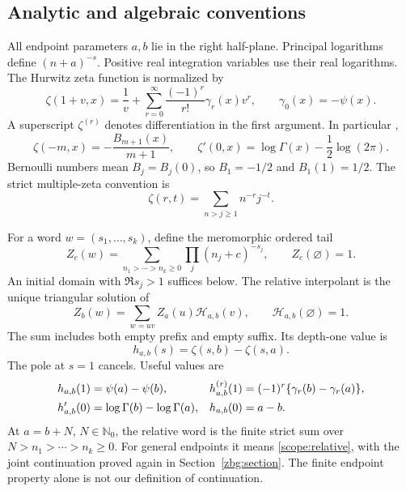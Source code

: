 \documentclass[11pt,letterpaper]{article}
\numberwithin{equation}{section}
\theoremstyle{plain}
\theoremstyle{definition}
\theoremstyle{remark}
\newcommand{\N}{\mathbb N}
\newcommand{\HH}{\mathcal H}
\begin{document}
\subsection{Analytic and algebraic conventions}

All endpoint parameters $a,b$ lie in the right half-plane.
Principal logarithms define $(n+a)^{-s}$. Positive real integration
variables use their real logarithms. The Hurwitz zeta function is
normalized by
\begin{equation}\label{scope:stieltjes}
 \zeta(1+v,x)=\frac1v+
       \sum_{r=0}^{\infty}\frac{(-1)^r}{r!}\gamma_r(x)v^r,
 \qquad \gamma_0(x)=-\psi(x).
\end{equation}
A superscript $\zeta^{(r)}$ denotes differentiation in the first
argument. In particular \cite[\S25.11]{DLMFHurwitz},
\begin{equation}\label{scope:hurwitz}
 \zeta(-m,x)=-\frac{B_{m+1}(x)}{m+1},\qquad
 \zeta'(0,x)=\log\Gamma(x)-\frac12\log(2\pi).
\end{equation}
Bernoulli numbers mean $B_j=B_j(0)$, so $B_1=-1/2$ and $B_1(1)=1/2$.
The strict multiple-zeta convention is
\[
 \zeta(r,t)=\sum_{n>j\geq1}n^{-r}j^{-t}.
\]

For a word $w=(s_1,\ldots,s_k)$, define the meromorphic ordered tail
\[
 Z_c(w)=\sum_{n_1>\cdots>n_k\geq0}
                      \prod_j(n_j+c)^{-s_j},\qquad Z_c(\varnothing)=1.
\]
An initial domain with $\Re s_j>1$ suffices below. The relative
interpolant is the unique triangular solution of
\begin{equation}\label{scope:relative}
 Z_b(w)=\sum_{w=uv}Z_a(u)\HH_{a,b}(v),\qquad
 \HH_{a,b}(\varnothing)=1.
\end{equation}
The sum includes both empty prefix and empty suffix. Its depth-one value is
\begin{equation}\label{scope:h}
 h_{a,b}(s)=\zeta(s,b)-\zeta(s,a).
\end{equation}
The pole at $s=1$ cancels. Useful values are
\begin{align}
 h_{a,b}(1)&=\psi(a)-\psi(b),&
 h_{a,b}^{(r)}(1)&=(-1)^r\{\gamma_r(b)-\gamma_r(a)\},\label{scope:hjets}\\
 h_{a,b}'(0)&=\log\Gamma(b)-\log\Gamma(a),&
 h_{a,b}(0)&=a-b.\notag
\end{align}
At $a=b+N$, $N\in\N_0$, the relative word is the finite strict sum
over $N>n_1>\cdots>n_k\geq0$. For general endpoints it means
\eqref{scope:relative}, with the joint continuation proved again in
Section~\ref{zbg:section}. The finite endpoint property alone is not
our definition of continuation.
\end{document}
